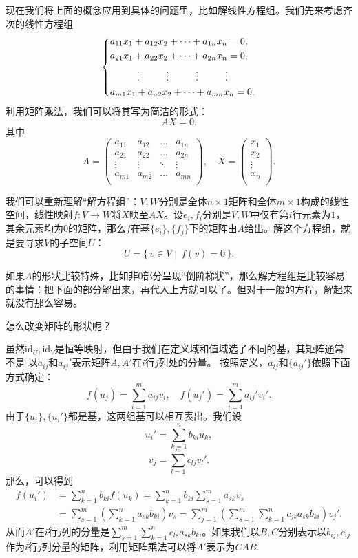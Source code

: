 现在我们将上面的概念应用到具体的问题里，比如解线性方程组。我们先来考虑齐次的线性方程组
\[
    \begin{dcases}
        a_{11}x_1+a_{12}x_2+\cdots+a_{1n}x_n=0,                               \\
        a_{21}x_1+a_{22}x_2+\cdots+a_{2n}x_n=0,                               \\
        \mbox{}\hfill\vdots\hfill\vdots \hfill\vdots\hfill\vdots\hfill\mbox{} \\
        a_{m1}x_1+a_{n2}x_2+\cdots +a_{mn}x_n=0.
    \end{dcases}
\]
利用矩阵乘法，我们可以将其写为简洁的形式：
\[AX=0.\]
其中
\[A = \begin{pmatrix}
        a_{11} & a_{12} & \ldots & a_{1n} \\
        a_{21} & a_{22} & \ldots & a_{2n} \\
        \vdots & \vdots & \ddots & \vdots \\
        a_{m1} & a_{m2} & \ldots & a_{mn} \\
    \end{pmatrix},\quad 
    X = \begin{pmatrix}
        x_1    \\
        x_2    \\
        \vdots \\
        x_n    \\
    \end{pmatrix}.\]

我们可以重新理解“解方程组”：$V,W$分别是全体$n\times 1$矩阵和全体$m\times 1$构成的线性空间，线性映射$f:V\to W$将$X$映至$AX$。设$e_i,f_i$分别是$V,W$中仅有第$i$行元素为$1$，其余元素均为$0$的矩阵，那么$f$在基$\{e_i\},\{f_j\}$下的矩阵由$A$给出。解这个方程组，就是要寻求$V$的子空间$U$：
\[U=\bigl\{\,v\in V\mid\, f(v)=0\,\bigr\}.\]

如果$A$的形状比较特殊，比如非$0$部分呈现“倒阶梯状”，那么解方程组是比较容易的事情：把下面的部分解出来，再代入上方就可以了。但对于一般的方程，解起来就没有那么容易。

怎么改变矩阵的形状呢？

虽然$\mathrm{id}_U,\mathrm{id}_V$是恒等映射，但由于我们在定义域和值域选了不同的基，其矩阵通常不是
以$a_{ij}$和$a_{ij}'$表示矩阵$A,A'$在$i$行$j$列处的分量。
按照定义，$a_{ij}$和$\{a_{ij}'\}$依照下面方式确定：
\[
    f(u_j)=\sum_{i=1}^ma_{ij}v_i,\quad f(u_j')=\sum_{i=1}^ma_{ij}'v_i'
    .\]
由于$\{u_i\},\{u_i'\}$都是基，这两组基可以相互表出。我们设
\[
    u_i'=\sum_{k=1}^nb_{ki}u_{k}
    ,\]
\[
    v_j=\sum_{l=1}^mc_{lj}v_l'
    .\]
那么，可以得到
\begin{align*}
    f(u_i') & =\sum_{k=1}^nb_{ki}f(u_k)
    =\sum_{k=1}^nb_{ki}\sum_{s=1}^ma_{sk}v_s             \\
            & =\sum_{s=1}^m\left( \sum_{k=1}^na_{sk}b_{ki} \right) v_s
    =\sum_{j=1}^m\left( \sum_{s=1}^m\sum_{k=1}^nc_{js}a_{sk}b_{ki} \right) v_j'.
\end{align*}
从而$A'$在$i$行$j$列的分量是$\sum_{s=1}^m\sum_{k=1}^nc_{ls}a_{sk}b_{ki}$。如果我们以$B,C$分别表示以$b_{ij},c_{ij}$作为$i$行$j$列分量的矩阵，利用矩阵乘法可以将$A'$表示为$CAB$.